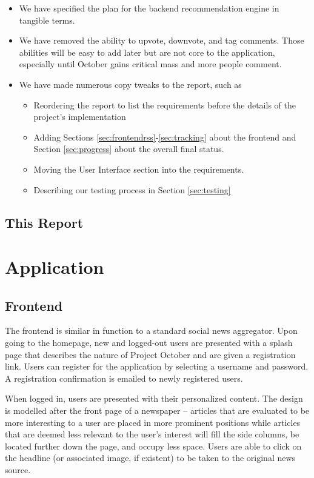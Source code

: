 \documentclass[11pt,letterpaper]{article}
\begin{document}
\begin{itemize}
\item We have specified the plan for the backend recommendation engine in tangible terms.
\item We have removed the ability to upvote, downvote, and tag comments. Those abilities will be easy to add later but are not core to the application, especially until October gains critical mass and more people comment.
\item We have made numerous copy tweaks to the report, such as
  \begin{itemize}
  \item Reordering the report to list the requirements before the details of the project's implementation
  \item Adding Sections \ref{sec:frontendrss}-\ref{sec:tracking} about the frontend and Section \ref{sec:progress} about the overall final status.
  \item Moving the User Interface section into the requirements.
  \item Describing our testing process in Section \ref{sec:testing}
  \end{itemize}
\end{itemize}

\subsection{This Report}

\section{Application}
\subsection{Frontend}
The frontend is similar in function to a standard social news aggregator.
Upon going to the homepage, new and logged-out users are presented with a splash page that describes the nature of Project October and are given a registration link.
Users can register for the application by selecting a username and password.
A registration confirmation is emailed to newly registered users.

When logged in, users are presented with their personalized content.
The design is modelled after the front page of a newspaper -- articles that are evaluated to be more interesting to a user are placed in more prominent positions while articles that are deemed less relevant to the user's interest will fill the side columns, be located further down the page, and occupy less space.
Users are able to click on the headline (or associated image, if existent) to be taken to the original news source.
\end{document}
